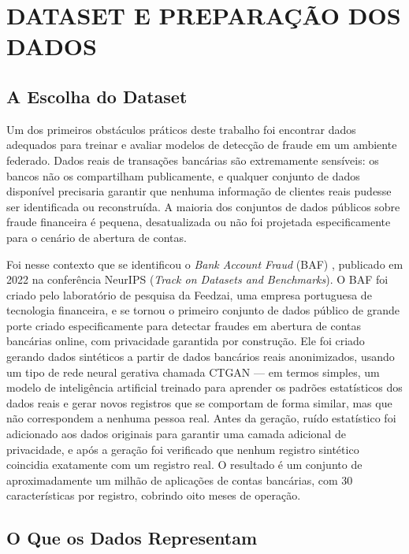 \section{DATASET E PREPARAÇÃO DOS DADOS}

\subsection{A Escolha do Dataset}

Um dos primeiros obstáculos práticos deste trabalho foi encontrar dados adequados para treinar e avaliar modelos de detecção de fraude em um ambiente federado. Dados reais de transações bancárias são extremamente sensíveis: os bancos não os compartilham publicamente, e qualquer conjunto de dados disponível precisaria garantir que nenhuma informação de clientes reais pudesse ser identificada ou reconstruída. A maioria dos conjuntos de dados públicos sobre fraude financeira é pequena, desatualizada ou não foi projetada especificamente para o cenário de abertura de contas.

Foi nesse contexto que se identificou o \textit{Bank Account Fraud} (BAF) \cite{jesus2022baf}, publicado em 2022 na conferência NeurIPS (\textit{Track on Datasets and Benchmarks}). O BAF foi criado pelo laboratório de pesquisa da Feedzai, uma empresa portuguesa de tecnologia financeira, e se tornou o primeiro conjunto de dados público de grande porte criado especificamente para detectar fraudes em abertura de contas bancárias online, com privacidade garantida por construção. Ele foi criado gerando dados sintéticos a partir de dados bancários reais anonimizados, usando um tipo de rede neural gerativa chamada CTGAN \cite{xu2019ctgan} --- em termos simples, um modelo de inteligência artificial treinado para aprender os padrões estatísticos dos dados reais e gerar novos registros que se comportam de forma similar, mas que não correspondem a nenhuma pessoa real. Antes da geração, ruído estatístico foi adicionado aos dados originais para garantir uma camada adicional de privacidade, e após a geração foi verificado que nenhum registro sintético coincidia exatamente com um registro real. O resultado é um conjunto de aproximadamente um milhão de aplicações de contas bancárias, com 30 características por registro, cobrindo oito meses de operação.

\subsection{O Que os Dados Representam}

